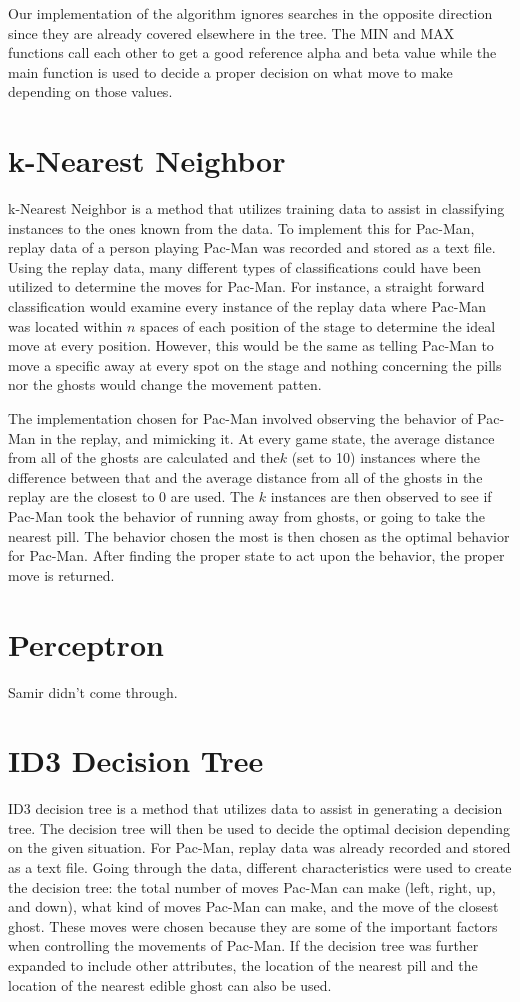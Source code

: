 \documentclass[a4paper,oneside,10pt]{report}
\begin{document}
Our implementation of the algorithm ignores searches in the opposite direction since they are already covered elsewhere in the tree. The MIN and MAX functions call each other to get a good reference alpha and beta value while the main function is used to decide a proper decision on what move to make depending on those values.

\section{k-Nearest Neighbor}\label{knn}

k-Nearest Neighbor is a method that utilizes training data to assist in classifying instances to the ones known from the data. To implement this for Pac-Man, replay data of a person playing Pac-Man was recorded and stored as a text file. Using the replay data, many different types of classifications could have been utilized to determine the moves for Pac-Man. For instance, a straight forward classification would examine every instance of the replay data where Pac-Man was located within $n$ spaces of each position of the stage to determine the ideal move at every position. However, this would be the same as telling Pac-Man to move a specific away at every spot on the stage and nothing concerning the pills nor the ghosts would change the movement patten. 

The implementation chosen for Pac-Man involved observing the behavior of Pac-Man in the replay, and mimicking it. At every game state, the average distance from all of the ghosts are calculated and the$k$ (set to 10) instances where the difference between that and the average distance from all of the ghosts in the replay are the closest to 0 are used. The $k$ instances are then observed to see if Pac-Man took the behavior of running away from ghosts, or going to take the nearest pill. The behavior chosen the most is then chosen as the optimal behavior for Pac-Man. After finding the proper state to act upon the behavior, the proper move is returned.

\section{Perceptron}\label{perceptron}
Samir didn't come through.

\section{ID3 Decision Tree}\label{id3}
ID3 decision tree is a method that utilizes data to assist in generating a decision tree. The decision tree will then be used to decide the optimal decision depending on the given situation. For Pac-Man, replay data was already recorded and stored as a text file. Going through the data, different characteristics were used to create the decision tree: the total number of moves Pac-Man can make (left, right, up, and down), what kind of moves Pac-Man can make, and the move of the closest ghost. These moves were chosen because they are some of the important factors when controlling the movements of Pac-Man. If the decision tree was further expanded to include other attributes, the location of the nearest pill and the location of the nearest edible ghost can also be used. 
\end{document}
